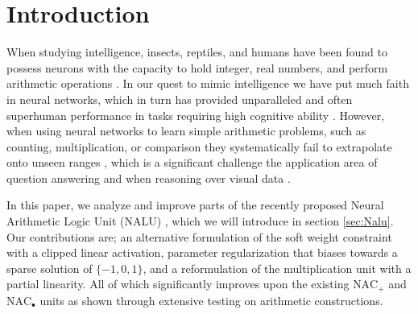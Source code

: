 \section{Introduction}
When studying intelligence, insects, reptiles, and humans have been found to possess neurons with the capacity to hold integer, real numbers, and perform arithmetic operations \cite{nieder-neuronal-number,rugani-arithmetic-chicks,gallistel-numbers-in-brain}.
In our quest to mimic intelligence we have put much faith in neural networks, which in turn has provided unparalleled and often superhuman performance in tasks requiring high cognitive ability \cite{natureGo,googleNMT,resnet}.
However, when using neural networks to learn simple arithmetic problems, such as counting, multiplication, or comparison they systematically fail to extrapolate onto unseen ranges \cite{stillNotSystematic,suzgun2019evaluating,trask-nalu}, which is a significant challenge the application area of question answering \cite{47761} and when reasoning over visual data \cite{johnson2017clevr,drewspaper}.

In this paper, we analyze and improve parts of the recently proposed Neural Arithmetic Logic Unit (NALU) \cite{trask-nalu}, which we will introduce in section \ref{sec:Nalu}. Our contributions are; an alternative formulation of the soft weight constraint with a clipped linear activation, parameter regularization that biases towards a sparse solution of $\{-1,0,1\}$, and a reformulation of the multiplication unit with a partial linearity. All of which significantly improves upon the existing $\text{NAC}_{+}$ and $\text{NAC}_{\bullet}$ units as shown through extensive testing on arithmetic constructions.

